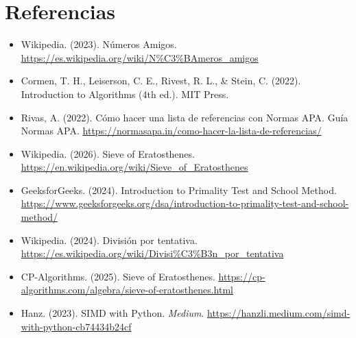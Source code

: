 \section*{Referencias}
\begin{itemize}
	\item Wikipedia. (2023). Números Amigos. \url{https://es.wikipedia.org/wiki/N\%C3\%BAmeros_amigos}
	\item Cormen, T. H., Leiserson, C. E., Rivest, R. L., \& Stein, C. (2022). Introduction to Algorithms (4th ed.). MIT Press.
	\item Rivas, A. (2022). Cómo hacer una lista de referencias con Normas APA. Guía Normas APA. \url{https://normasapa.in/como-hacer-la-lista-de-referencias/}
	\item Wikipedia. (2026). Sieve of Eratosthenes. \url{https://en.wikipedia.org/wiki/Sieve_of_Eratosthenes}
	\item GeeksforGeeks. (2024). Introduction to Primality Test and School Method. \url{https://www.geeksforgeeks.org/dsa/introduction-to-primality-test-and-school-method/}
	\item Wikipedia. (2024). División por tentativa. \url{https://es.wikipedia.org/wiki/Divisi\%C3\%B3n_por_tentativa}
	\item CP-Algorithms. (2025). Sieve of Eratosthenes. \url{https://cp-algorithms.com/algebra/sieve-of-eratosthenes.html}
	\item Hanz. (2023). SIMD with Python. \textit{Medium}. \url{https://hanzli.medium.com/simd-with-python-cb74434b24cf}
\end{itemize}
